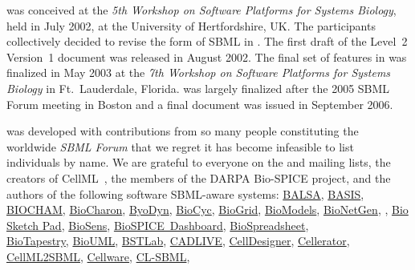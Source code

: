 \sbmltwo was conceived at the \emph{5th Workshop on Software
  Platforms for Systems Biology}, held in July 2002, at the
University of Hertfordshire, UK.  The participants collectively
decided to revise the form of SBML in \sbmltwo.  The first draft
of the Level~2 Version~1 document was released in August 2002. The
final set of features in \sbmltwoone was finalized in May 2003 at
the \emph{7th Workshop on Software Platforms for Systems Biology}
in Ft.\ Lauderdale, Florida.  \sbmltwotwo was largely finalized
after the 2005 SBML Forum meeting in Boston and a final document
was issued in September 2006.

\sbmltwothree was developed with contributions from so many people
constituting the worldwide \emph{SBML Forum} that we regret it has
become infeasible to list individuals by name.  We are grateful to
everyone on the
 and
 mailing
lists, the creators of CellML~\citep{hedley:2001b}, the members of
the DARPA Bio-SPICE project, and the authors of the following
software SBML-aware systems:
\href{http://depts.washington.edu/ventures/UW_Technology/Emerging_Technologies/CSI.php}{BALSA},
\href{http://www.basis.ncl.ac.uk}{BASIS},
\href{http://contraintes.inria.fr/BIOCHAM/}{BIOCHAM},
\href{http://www.cis.upenn.edu/biocomp}{BioCharon},
\href{http://diana.imim.es/ByoDyn}{ByoDyn},
\href{http://www.biocyc.org}{BioCyc},
\href{http://biocomp.ece.utk.edu/tools.html}{BioGrid},
\href{http://www.biomodels.net}{BioModels},
\href{http://cellsignaling.lanl.gov/bionetgen}{BioNetGen},
,
\href{http://www.cis.upenn.edu/biocomp/new_html/biosketch.php3}{Bio Sketch Pad},
\href{http://www.chemengr.ucsb.edu/~ceweb/faculty/doyle/biosens/BioSens.htm}{BioSens},
\href{http://www.biospice.org}{BioSPICE~Dashboard},
\href{http://biocomp.ece.utk.edu/tools.html}{\mbox{BioSpreadsheet}},\\
\href{http://labs.systemsbiology.net/bolouri/software/BioTapestry/}{BioTapestry},
\href{http://www.biouml.org/}{BioUML},
\href{https://bioinformatics.musc.edu/bstlab/}{BSTLab},
\href{http://kurata21.bse.kyutech.ac.jp/cadlive/}{CADLIVE},
\href{http://celldesigner.org}{CellDesigner},
\href{http://www-aig.jpl.nasa.gov/public/mls/cellerator/}{Cellerator},
\href{http://sbml.org/software/cellml2sbml/}{CellML2SBML},
\href{http://www.bii.a-star.edu.sg/sbg/cellware}{\mbox{Cellware}},
\href{http://common-lisp.net/project/cl-sbml/}{CL-SBML},\\

